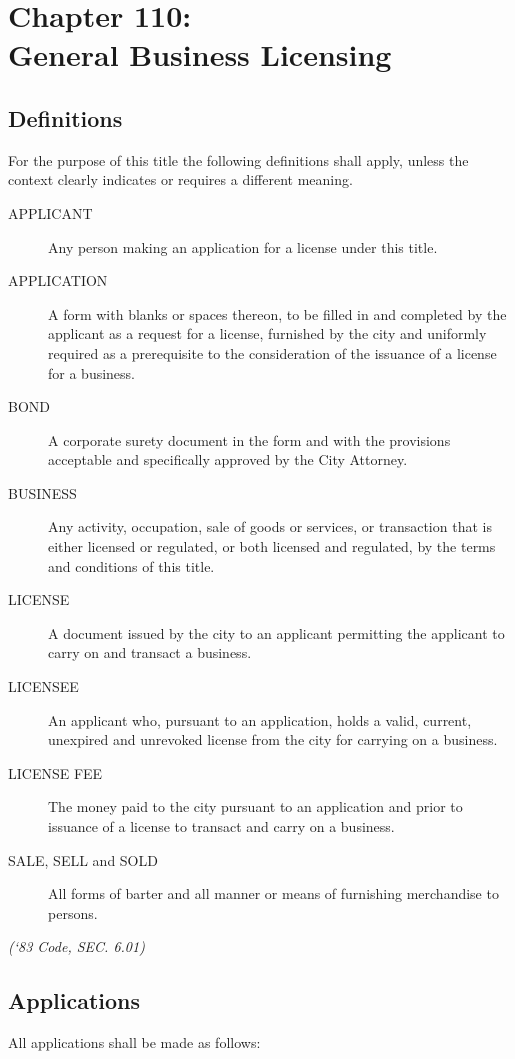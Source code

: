 \chapter*{Chapter 110: \\
	General Business Licensing}
    \minitoc
    \pagebreak

\section{Definitions}
For the purpose of this title the following definitions shall apply, unless the context clearly indicates or requires a different meaning.
\begin{description}
    \item[APPLICANT]  Any person making an application for a license under this title.
    \item[APPLICATION]  A form with blanks or spaces thereon, to be filled in and completed by the applicant as a request for a license, furnished by the city and uniformly required as a prerequisite to the consideration of the issuance of a license for a business.
    \item[BOND]  A corporate surety document in the form and with the provisions acceptable and specifically approved by the City Attorney.
    \item[BUSINESS]  Any activity, occupation, sale of goods or services, or transaction that is either licensed or regulated, or both licensed and regulated, by the terms and conditions of this title.
    \item[LICENSE]  A document issued by the city to an applicant permitting the applicant to carry on and transact a business.
    \item[LICENSEE]  An applicant who, pursuant to an application, holds a valid, current, unexpired and unrevoked license from the city for carrying on a business.
    \item[LICENSE FEE]  The money paid to the city pursuant to an application and prior to issuance of a license to transact and carry on a business.
    \item[SALE, SELL and SOLD]  All forms of barter and all manner or means of furnishing merchandise to persons.
\end{description}
\emph{(‘83 Code, SEC. 6.01)}

\section{Applications}
All applications shall be made as follows:
